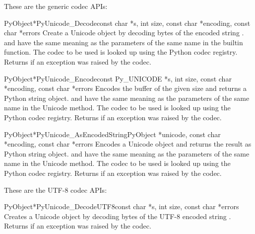 
These are the generic codec APIs:

\begin{cfuncdesc}{PyObject*}{PyUnicode_Decode}{const char *s,
                                               int size,
                                               const char *encoding,
                                               const char *errors}
  Create a Unicode object by decoding  bytes of the encoded
  string .   and  have the same
  meaning as the parameters of the same name in the
   builtin function.  The codec to be used is
  looked up using the Python codec registry.  Returns \NULL{} if an
  exception was raised by the codec.
\end{cfuncdesc}

\begin{cfuncdesc}{PyObject*}{PyUnicode_Encode}{const Py_UNICODE *s,
                                               int size,
                                               const char *encoding,
                                               const char *errors}
  Encodes the  buffer of the given size and returns
  a Python string object.   and  have the
  same meaning as the parameters of the same name in the Unicode
   method.  The codec to be used is looked up using
  the Python codec registry.  Returns \NULL{} if an exception was
  raised by the codec.
\end{cfuncdesc}

\begin{cfuncdesc}{PyObject*}{PyUnicode_AsEncodedString}{PyObject *unicode,
                                               const char *encoding,
                                               const char *errors}
  Encodes a Unicode object and returns the result as Python string
  object.  and  have the same meaning as the
  parameters of the same name in the Unicode  method.
  The codec to be used is looked up using the Python codec registry.
  Returns \NULL{} if an exception was raised by the codec.
\end{cfuncdesc}


These are the UTF-8 codec APIs:

\begin{cfuncdesc}{PyObject*}{PyUnicode_DecodeUTF8}{const char *s,
                                               int size,
                                               const char *errors}
  Creates a Unicode object by decoding  bytes of the UTF-8
  encoded string . Returns \NULL{} if an exception was raised
  by the codec.
\end{cfuncdesc}

